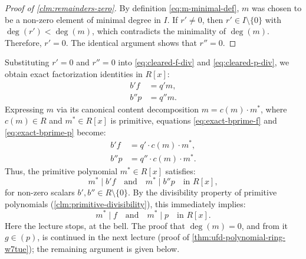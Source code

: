 \begin{proofWrapper}
\begin{content}
\begin{proof}[Proof of \cref{clm:remainders-zero}]
By definition \eqref{eq:m-minimal-def}, $m$ was chosen to be a non-zero element of minimal degree in $I$.
If $r' \neq 0$, then $r' \in I \setminus \{0\}$ with $\deg(r') < \deg(m)$, which contradicts the minimality of $\deg(m)$. Therefore, $r' = 0$.
The identical argument shows that $r'' = 0$.
\end{proof}

\begin{steps}
Substituting $r' = 0$ and $r'' = 0$ into \eqref{eq:cleared-f-div} and \eqref{eq:cleared-p-div}, we obtain exact factorization identities in $R[x]$:
\begin{align}
b' f &= q' m, \label{eq:exact-bprime-f} \\
b'' p &= q'' m. \label{eq:exact-bprime-p}
\end{align}
Expressing $m$ via its canonical content decomposition $m = c(m) \cdot m^*$, where $c(m) \in R$ and $m^* \in R[x]$ is primitive, equations \eqref{eq:exact-bprime-f} and \eqref{eq:exact-bprime-p} become:
\begin{align}
b' f &= q' \cdot c(m) \cdot m^*, \label{eq:div-bprime-f-mstar} \\
b'' p &= q'' \cdot c(m) \cdot m^*. \label{eq:div-bprime-p-mstar}
\end{align}
Thus, the primitive polynomial $m^* \in R[x]$ satisfies:
\[
m^* \mid b' f \quad \text{and} \quad m^* \mid b'' p \quad \text{in } R[x],
\]
for non-zero scalars $b', b'' \in R \setminus \{0\}$.
By the divisibility property of primitive polynomials (\cref{clm:primitive-divisibility}), this immediately implies:
\[
m^* \mid f \quad \text{and} \quad m^* \mid p \quad \text{in } R[x].
\]
Here the lecture stops, at the bell. The proof that $\deg(m) = 0$, and from it $g \in (p)$, is continued in the next lecture (proof of \cref{thm:ufd-polynomial-ring-w7tue}); the remaining argument is given below.
\end{steps}
\end{content}


\end{proofWrapper}
